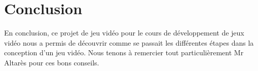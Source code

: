 \section{Conclusion}
En conclusion, ce projet de jeu vidéo pour le cours de développement de jeux vidéo nous a permis de découvrir comme se passait les différentes étapes dans la conception d'un jeu vidéo. 
Nous tenons à remercier tout particulièrement Mr Altarès pour ces bons conseils.
